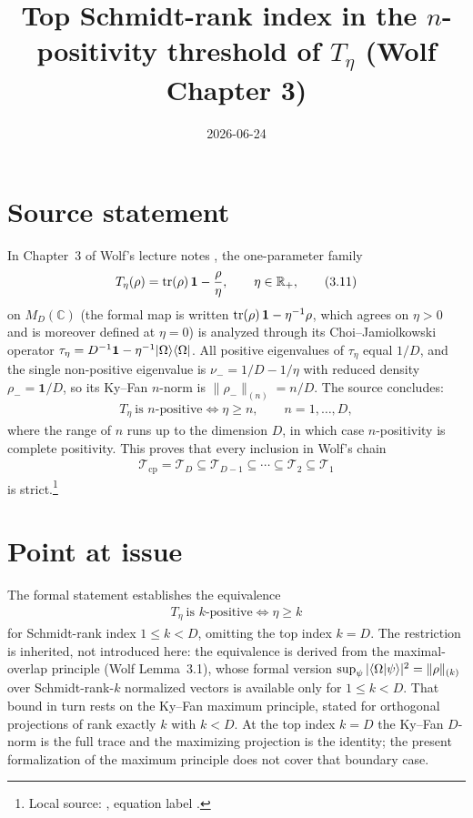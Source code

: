 \documentclass{article}
\title{Top Schmidt-rank index in the $n$-positivity threshold of $T_\eta$
(Wolf Chapter 3)}
\author{}
\date{2026-06-24}
\begin{document}
\maketitle
{}

\section{Source statement}

In Chapter~3 of Wolf's lecture notes \cite{Wolf2012Quantum}, the one-parameter
family
\begin{align}
  T_\eta(\rho)=\operatorname{tr}(\rho)\,\mathbf 1-\frac{\rho}{\eta},
  \qquad \eta\in\mathbb R_+,
  \tag{3.11}
\end{align}
on $M_D(\mathbb C)$ (the formal map is written $\operatorname{tr}(\rho)\,\mathbf 1-\eta^{-1}\rho$,
which agrees on $\eta>0$ and is moreover defined at $\eta=0$) is analyzed
through its Choi--Jamiolkowski operator
$\tau_\eta=D^{-1}\mathbf 1-\eta^{-1}|\Omega\rangle\langle \Omega|$.  All positive
eigenvalues of $\tau_\eta$ equal $1/D$, and the single non-positive eigenvalue
is $\nu_-=1/D-1/\eta$ with reduced density $\rho_-=\mathbf 1/D$, so its
Ky--Fan $n$-norm is $\|\rho_-\|_{(n)}=n/D$.  The source concludes:
\begin{align}
  T_\eta\ \text{is $n$-positive}\iff \eta\ge n,
  \qquad n=1,\dots,D,
\end{align}
where the range of $n$ runs up to the dimension $D$, in which case
$n$-positivity is complete positivity.  This proves that every inclusion in
Wolf's chain
\begin{align}
  \mathcal T_{\mathrm{cp}}=\mathcal T_D\subseteq
  \mathcal T_{D-1}\subseteq\cdots\subseteq\mathcal T_2\subseteq\mathcal T_1
  \tag{3.3}
\end{align}
is strict.\footnote{Local source:
,
equation label .}

\section{Point at issue}

The formal statement establishes the equivalence
\begin{align}
  T_\eta\ \text{is $k$-positive}\iff \eta\ge k
\end{align}
for Schmidt-rank index $1\le k<D$, omitting the top index $k=D$.  The
restriction is inherited, not introduced here: the equivalence is derived from
the maximal-overlap principle (Wolf Lemma~3.1), whose formal version
$\sup_\psi|\langle \Omega | \psi \rangle|^2=\|\rho\|_{(k)}$ over Schmidt-rank-$k$
normalized vectors is available only for $1\le k<D$.  That bound in turn rests
on the Ky--Fan maximum principle, stated for orthogonal projections of rank
exactly $k$ with $k<D$.  At the top index $k=D$ the Ky--Fan $D$-norm is the
full trace and the maximizing projection is the identity; the present
formalization of the maximum principle does not cover that boundary case.
\end{document}
